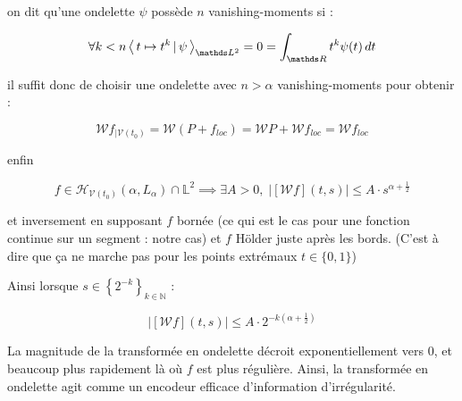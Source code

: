 \begin{definition}
	on dit qu'une ondelette $\psi$ possède $n$ vanishing-moments si :

	\begin{equation*}
		\forall k < n \prodscalselon{t \mapsto t^k}{\psi}{\mathds L^2} = 0 = \int_{\mathds R} t^k \psi(t) \, dt
	\end{equation*}

\end{definition}

\begin{prop}

\end{prop}

il suffit donc de choisir une ondelette avec $n > \alpha$ vanishing-moments pour obtenir :

\begin{equation*}
	\mathcal W f_{| \mathcal V(t_0)} {=} \mathcal W ( P + f_{loc} ) = \mathcal W P + \mathcal W f_{loc} = \mathcal W f_{loc}
\end{equation*}

enfin
\begin{thm}


	\begin{equation*}
		f \in \mathcal H_{\mathcal V({t_0})}(\alpha, L_\alpha) \cap \mathds L^2 \implies \exists A>0, \; \left|\left[\mathcal Wf\right](t, s)\right| \leq A \cdot s^{\alpha  + \frac 1 2}
	\end{equation*}

	et inversement en supposant $f$ bornée (ce qui est le cas pour une fonction continue sur un segment : notre cas) et $f$ Hölder juste après les bords. (C'est à dire que ça ne marche pas pour les points extrémaux $t \in \{0, 1\}$)
\end{thm}

Ainsi lorsque $s \in \left\{ 2^{-k} \right\}_{k \in \mathds N}$ :

\begin{equation*}
	\left|\left[\mathcal Wf\right](t, s)\right| \leq A \cdot 2^{-k(\alpha  + \frac 1 2)}
\end{equation*}

La magnitude de la transformée en ondelette décroit exponentiellement vers 0, et beaucoup plus rapidement là où $f$ est plus régulière. Ainsi, la transformée en ondelette agit comme un encodeur efficace d'information d'irrégularité.


